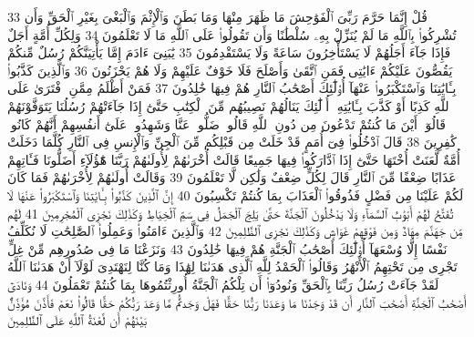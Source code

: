 {\tiny\colorbox{cl_aya}{33}} قُلْ إِنَّمَا حَرَّمَ رَبِّىَ ٱلْفَوَٰحِشَ مَا ظَهَرَ مِنْهَا وَمَا بَطَنَ وَٱلْإِثْمَ وَٱلْبَغْىَ بِغَيْرِ ٱلْحَقِّ وَأَن تُشْرِكُوا۟ بِٱللَّهِ مَا لَمْ يُنَزِّلْ بِهِۦ سُلْطَٰنًا وَأَن تَقُولُوا۟ عَلَى ٱللَّهِ مَا لَا تَعْلَمُونَ
{\tiny\colorbox{cl_aya}{34}} وَلِكُلِّ أُمَّةٍ أَجَلٌ فَإِذَا جَآءَ أَجَلُهُمْ لَا يَسْتَأْخِرُونَ سَاعَةً وَلَا يَسْتَقْدِمُونَ
{\tiny\colorbox{cl_aya}{35}} يَٰبَنِىٓ ءَادَمَ إِمَّا يَأْتِيَنَّكُمْ رُسُلٌ مِّنكُمْ يَقُصُّونَ عَلَيْكُمْ ءَايَٰتِى فَمَنِ ٱتَّقَىٰ وَأَصْلَحَ فَلَا خَوْفٌ عَلَيْهِمْ وَلَا هُمْ يَحْزَنُونَ
{\tiny\colorbox{cl_aya}{36}} وَٱلَّذِينَ كَذَّبُوا۟ بِـَٔايَٰتِنَا وَٱسْتَكْبَرُوا۟ عَنْهَآ أُو۟لَٰٓئِكَ أَصْحَٰبُ ٱلنَّارِ هُمْ فِيهَا خَٰلِدُونَ
{\tiny\colorbox{cl_aya}{37}} فَمَنْ أَظْلَمُ مِمَّنِ ٱفْتَرَىٰ عَلَى ٱللَّهِ كَذِبًا أَوْ كَذَّبَ بِـَٔايَٰتِهِۦٓ أُو۟لَٰٓئِكَ يَنَالُهُمْ نَصِيبُهُم مِّنَ ٱلْكِتَٰبِ حَتَّىٰٓ إِذَا جَآءَتْهُمْ رُسُلُنَا يَتَوَفَّوْنَهُمْ قَالُوٓا۟ أَيْنَ مَا كُنتُمْ تَدْعُونَ مِن دُونِ ٱللَّهِ قَالُوا۟ ضَلُّوا۟ عَنَّا وَشَهِدُوا۟ عَلَىٰٓ أَنفُسِهِمْ أَنَّهُمْ كَانُوا۟ كَٰفِرِينَ
{\tiny\colorbox{cl_aya}{38}} قَالَ ٱدْخُلُوا۟ فِىٓ أُمَمٍ قَدْ خَلَتْ مِن قَبْلِكُم مِّنَ ٱلْجِنِّ وَٱلْإِنسِ فِى ٱلنَّارِ كُلَّمَا دَخَلَتْ أُمَّةٌ لَّعَنَتْ أُخْتَهَا حَتَّىٰٓ إِذَا ٱدَّارَكُوا۟ فِيهَا جَمِيعًا قَالَتْ أُخْرَىٰهُمْ لِأُولَىٰهُمْ رَبَّنَا هَٰٓؤُلَآءِ أَضَلُّونَا فَـَٔاتِهِمْ عَذَابًا ضِعْفًا مِّنَ ٱلنَّارِ قَالَ لِكُلٍّ ضِعْفٌ وَلَٰكِن لَّا تَعْلَمُونَ
{\tiny\colorbox{cl_aya}{39}} وَقَالَتْ أُولَىٰهُمْ لِأُخْرَىٰهُمْ فَمَا كَانَ لَكُمْ عَلَيْنَا مِن فَضْلٍ فَذُوقُوا۟ ٱلْعَذَابَ بِمَا كُنتُمْ تَكْسِبُونَ
{\tiny\colorbox{cl_aya}{40}} إِنَّ ٱلَّذِينَ كَذَّبُوا۟ بِـَٔايَٰتِنَا وَٱسْتَكْبَرُوا۟ عَنْهَا لَا تُفَتَّحُ لَهُمْ أَبْوَٰبُ ٱلسَّمَآءِ وَلَا يَدْخُلُونَ ٱلْجَنَّةَ حَتَّىٰ يَلِجَ ٱلْجَمَلُ فِى سَمِّ ٱلْخِيَاطِ وَكَذَٰلِكَ نَجْزِى ٱلْمُجْرِمِينَ
{\tiny\colorbox{cl_aya}{41}} لَهُم مِّن جَهَنَّمَ مِهَادٌ وَمِن فَوْقِهِمْ غَوَاشٍ وَكَذَٰلِكَ نَجْزِى ٱلظَّٰلِمِينَ
{\tiny\colorbox{cl_aya}{42}} وَٱلَّذِينَ ءَامَنُوا۟ وَعَمِلُوا۟ ٱلصَّٰلِحَٰتِ لَا نُكَلِّفُ نَفْسًا إِلَّا وُسْعَهَآ أُو۟لَٰٓئِكَ أَصْحَٰبُ ٱلْجَنَّةِ هُمْ فِيهَا خَٰلِدُونَ
{\tiny\colorbox{cl_aya}{43}} وَنَزَعْنَا مَا فِى صُدُورِهِم مِّنْ غِلٍّ تَجْرِى مِن تَحْتِهِمُ ٱلْأَنْهَٰرُ وَقَالُوا۟ ٱلْحَمْدُ لِلَّهِ ٱلَّذِى هَدَىٰنَا لِهَٰذَا وَمَا كُنَّا لِنَهْتَدِىَ لَوْلَآ أَنْ هَدَىٰنَا ٱللَّهُ لَقَدْ جَآءَتْ رُسُلُ رَبِّنَا بِٱلْحَقِّ وَنُودُوٓا۟ أَن تِلْكُمُ ٱلْجَنَّةُ أُورِثْتُمُوهَا بِمَا كُنتُمْ تَعْمَلُونَ
{\tiny\colorbox{cl_aya}{44}} وَنَادَىٰٓ أَصْحَٰبُ ٱلْجَنَّةِ أَصْحَٰبَ ٱلنَّارِ أَن قَدْ وَجَدْنَا مَا وَعَدَنَا رَبُّنَا حَقًّا فَهَلْ وَجَدتُّم مَّا وَعَدَ رَبُّكُمْ حَقًّا قَالُوا۟ نَعَمْ فَأَذَّنَ مُؤَذِّنٌۢ بَيْنَهُمْ أَن لَّعْنَةُ ٱللَّهِ عَلَى ٱلظَّٰلِمِينَ
